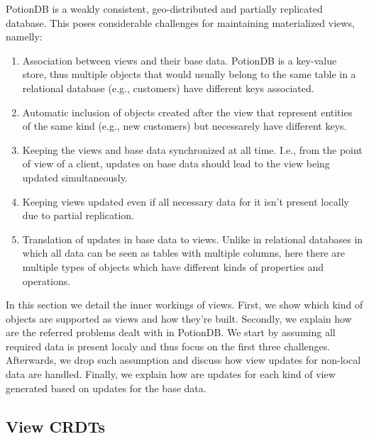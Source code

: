 \documentclass{vldb}
\begin{document}
PotionDB is a weakly consistent, geo-distributed and partially replicated database.
This poses considerable challenges for maintaining materialized views, namelly:
\begin{enumerate}
	\item Association between views and their base data. 
	PotionDB is a key-value store, thus multiple objects that would usually belong to the same table in a relational database (e.g., customers) have different keys associated.
	\item Automatic inclusion of objects created after the view that represent entities of the same kind (e.g., new customers) but necessarely have different keys.
	\item Keeping the views and base data synchronized at all time.
	I.e., from the point of view of a client, updates on base data should lead to the view being updated simultaneously.
	\item Keeping views updated even if all necessary data for it isn't present locally due to partial replication.
	\item Translation of updates in base data to views. 
	Unlike in relational databases in which all data can be seen as tables with multiple columns, here there are multiple types of objects which have different kinds of properties and operations.
\end{enumerate}

In this section we detail the inner workings of views.
First, we show which kind of objects are supported as views and how they're built.
Secondly, we explain how are the referred problems dealt with in PotionDB.
We start by assuming all required data is present localy and thus focus on the first three challenges.
Afterwards, we drop such assumption and discuss how view updates for non-local data are handled.
Finally, we explain how are updates for each kind of view generated based on updates for the base data.


\subsection{View CRDTs}
\end{document}
